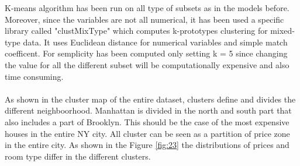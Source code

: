 \documentclass{FR16}
\begin{document}
K-means algorithm has been run on all type of subsets as in the models before. Moreover, since the variables are not all numerical, it has been used a specific library called "clustMixType" which computes k-prototypes clustering for mixed-type data. It uses Euclidean distance for numerical variables and simple match coefficent. For semplicity has been computed only setting k = 5 since changing the value for all the different subset will be computationally expensive and also time consuming. \\\\
As shown in the cluster map of the entire dataset, clusters define and divides the different neighboorhood. Manhattan is divided in the north and south part that also includes a part of Brooklyn. This should be the case of the most expensive houses in the entire NY city. All cluster can be seen as a partition of price zone in the entire city. As shown in the Figure \ref{fig:23} the distributions of prices and room type differ in the different clusters.
\end{document}
